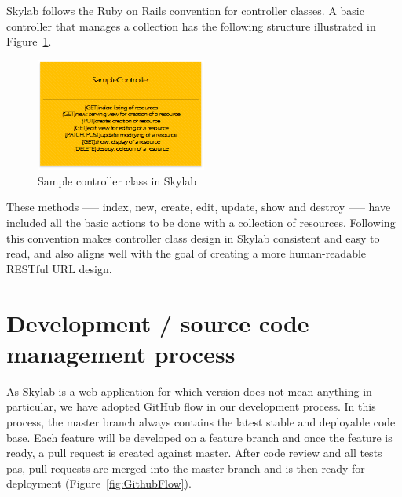 Skylab follows the Ruby on Rails convention for controller classes. A basic controller that manages a collection has the following structure illustrated in Figure~\ref{fig:SkylabSampleController}.

\begin{figure}[h]
  \centering
  \includegraphics[width=0.5\textwidth]{Images/Skylab_Sample_Controller.png}
  \caption{Sample controller class in Skylab}
  \label{fig:SkylabSampleController}
\end{figure}

These methods —-- index, new, create, edit, update, show and destroy —-- have included all the basic actions to be done with a collection of resources. Following this convention makes controller class design in Skylab consistent and easy to read, and also aligns well with the goal of creating a more human-readable RESTful URL design.

\section{Development / source code management process}

As Skylab is a web application for which version does not mean anything in particular, we have adopted GitHub flow in our development process\cite{citation8}.
In this process, the master branch always contains the latest stable and deployable code base. Each feature will be developed on a feature branch and once the feature is ready, a pull request is created against master. After code review and all tests pas, pull requests are merged into the master branch and is then ready for deployment (Figure~\ref{fig:GithubFlow}).

